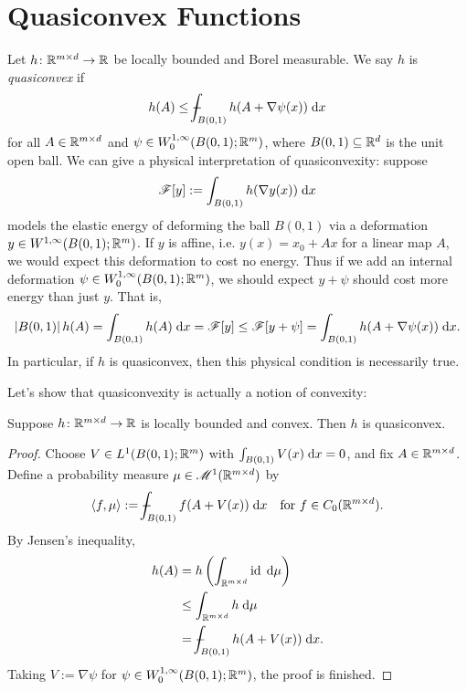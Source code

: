 \section{Quasiconvex Functions}
Let $h \colon \mathbb{R}^{m \times d} \to \mathbb{R}$ be locally bounded and Borel measurable. We say $h$ is \textit{quasiconvex} if 
\begin{equation}
    h(A) \leq \dashint_{B(0,1)} h(A + \nabla \psi(x)) \; \d x
\end{equation}
for all $A \in \mathbb{R}^{m \times d}$ and $\psi \in W_0^{1,\infty}(B(0,1);\mathbb{R}^m)$, where $B(0,1) \subseteq \mathbb{R}^d$ is the unit open ball. We can give a physical interpretation of quasiconvexity: suppose 
\begin{equation}
    \mathscr{F}[y] := \int_{B(0,1)} h(\nabla y(x)) \; \mathrm{d} x
\end{equation}
models the elastic energy of deforming the ball $B(0,1)$ via a deformation $y \in W^{1,\infty}(B(0,1);\mathbb{R}^m)$. If $y$ is affine, i.e. $y(x) = x_0 + Ax$ for a linear map $A$, we would expect this deformation to cost no energy. Thus if we add an internal deformation $\psi \in W_0^{1,\infty}(B(0,1);\mathbb{R}^m)$, we should expect $y + \psi$ should cost more energy than just $y$. That is,
\begin{equation}
    \left\lvert {B(0,1)} \right\rvert h(A) = \int_{B(0,1)} h(A) \; \mathrm{d} x = \mathscr{F}[y] \leq \mathscr{F}[y + \psi] = \int_{B(0,1)} h(A + \nabla\psi(x)) \; \mathrm{d} x.
\end{equation}
In particular, if $h$ is quasiconvex, then this physical condition is necessarily true.

Let's show that quasiconvexity is actually a notion of convexity:
\begin{lemma}
    Suppose $h \colon \mathbb{R}^{m \times d} \to \mathbb{R}$ is locally bounded and convex. Then $h$ is quasiconvex.
\end{lemma}
\begin{proof}
    Choose $V \in L^1(B(0,1);\mathbb{R}^m)$ with $\int_{B(0,1)} V(x) \; \mathrm{d} x = 0$, and fix $A \in \mathbb{R}^{m \times d}$. Define a probability measure $\mu \in \mathscr{M}^1(\mathbb{R}^{m \times d})$ by 
    \begin{equation}
        \angles{f,\mu} := \dashint_{B(0,1)} f(A + V(x)) \; \d x \quad \text{for } f \in C_0(\bbR^{m \times d}).
    \end{equation}
    By Jensen's inequality,
    \begin{equation} \begin{aligned}
        h(A) &= h\parens{ \int_{\bbR^{m \times d}} \id \; \d\mu } \\
             &\leq \int_{\bbR^{m \times d}} h \; \d\mu \\
             &= \dashint_{B(0,1)} h(A + V(x)) \; \d x.
    \end{aligned} \end{equation}
    Taking $V := \nabla \psi$ for $\psi \in W^{1,\infty}_0(B(0,1);\mathbb{R}^m)$, the proof is finished.
\end{proof}

